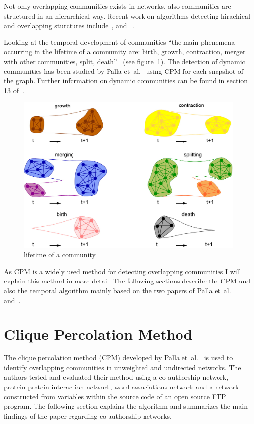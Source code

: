 \documentclass[runningheads,a4paper]{llncs}
\begin{document}
Not only overlapping communities exists in networks, also communities are structured in an hierarchical way.
Recent work on algorithms detecting hirachical and overlapping sturctures  include~\cite{1367-2630-11-3-033015}, \cite{Cui201485} and~ \cite{Shen20091706}.

Looking at the temporal development of communities ``the main phenomena occurring in the lifetime of a community are: birth, growth, contraction, merger with other communities, split, death''~\cite{fortunato2010community} (see figure~\ref{fig:evolution}).
The detection of dynamic communities has been studied by Palla et~al.~\cite{palla2007quantifying} using CPM for each snapshot of the graph. Further information on dynamic communities can be found in section 13 of~\cite{fortunato2010community}.

\begin{figure}
	\includegraphics[width=\textwidth]{villsize.jpg}
	\caption{lifetime of a community}
	\label{fig:evolution}
\end{figure}

As CPM is a widely used method for detecting overlapping communities I will explain this method in more detail. The following sections describe the CPM and also the temporal algorithm mainly based on the two papers of Palla et~al.~\cite{palla2005uncovering} and~\cite{palla2007quantifying}.

\section{Clique Percolation Method}
\label{cpm}
The clique percolation method (CPM) developed by Palla et~al.~\cite{palla2007quantifying} is used to identify overlapping communities in unweighted and undirected networks.
The authors tested and evaluated their method using a co-authorship network, protein-protein interaction network, word associations network and a network constructed from variables within the source code of an open source FTP program.
The following section explains the algorithm and summarizes the main findings of the paper regarding co-authorship networks.
\end{document}
